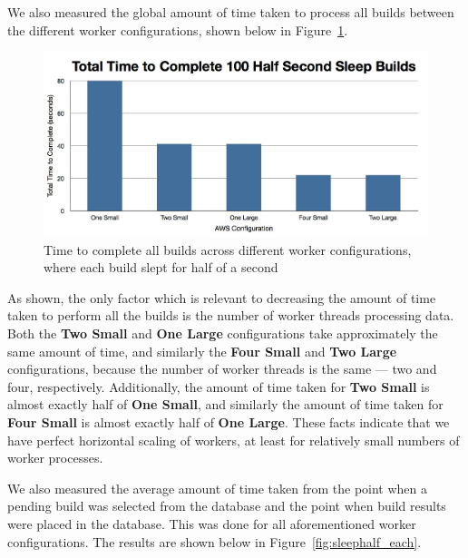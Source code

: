 \documentclass{scrartcl}
\begin{document}
We also measured the global amount of time taken to process all builds between the different worker configurations, shown below in Figure~\ref{fig:sleephalf_all}.

\begin{figure}[h!]
  \begin{center}
    \includegraphics[scale=0.45]{raw_data/sleep0.5/time_to_complete_all.jpg}
  \end{center}
  \caption{Time to complete all builds across different worker configurations, where each build slept for half of a second}
  \label{fig:sleephalf_all}
\end{figure}

As shown, the only factor which is relevant to decreasing the amount of time taken to perform all the builds is the number of worker threads processing data.
Both the \textbf{Two Small} and \textbf{One Large} configurations take approximately the same amount of time, and similarly the \textbf{Four Small} and \textbf{Two Large} configurations, because the number of worker threads is the same --- two and four, respectively.
Additionally, the amount of time taken for \textbf{Two Small} is almost exactly half of \textbf{One Small}, and similarly the amount of time taken for \textbf{Four Small} is almost exactly half of \textbf{One Large}.
These facts indicate that we have perfect horizontal scaling of workers, at least for relatively small numbers of worker processes.

We also measured the average amount of time taken from the point when a pending build was selected from the database and the point when build results were placed in the database.
This was done for all aforementioned worker configurations.
The results are shown below in Figure~\ref{fig:sleephalf_each}.
\end{document}
